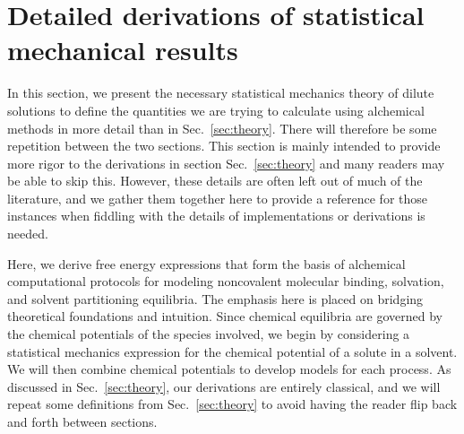 \documentclass[9pt,bestpractices]{livecoms}
\begin{document}


%


\section{Detailed derivations of statistical mechanical results}
\label{sec:derivations}

In this section, we present the necessary statistical mechanics theory of dilute solutions to define the quantities we are trying to calculate using alchemical methods in more detail than in Sec.~\ref{sec:theory}. There will therefore be some repetition between the two sections.  This section is mainly intended to provide more rigor to the derivations in section Sec.~\ref{sec:theory} and many readers may be able to skip this.  However, these details are often left out of much of the literature, and we gather them together here to provide a reference for those instances when fiddling with the details of implementations or derivations is needed.

Here, we derive free energy expressions that form the basis of alchemical computational protocols for modeling noncovalent molecular binding, solvation, and solvent partitioning equilibria. The emphasis here is placed on bridging theoretical foundations and intuition. Since chemical equilibria are governed by the chemical potentials of the species involved, we begin by considering a statistical mechanics expression for the chemical potential of a solute in a solvent. We will then combine chemical potentials to develop models for each process.  As discussed in Sec.~\ref{sec:theory}, our derivations are entirely classical, and we will repeat some definitions from Sec.~\ref{sec:theory} to avoid having the reader flip back and forth between sections.
\end{document}
